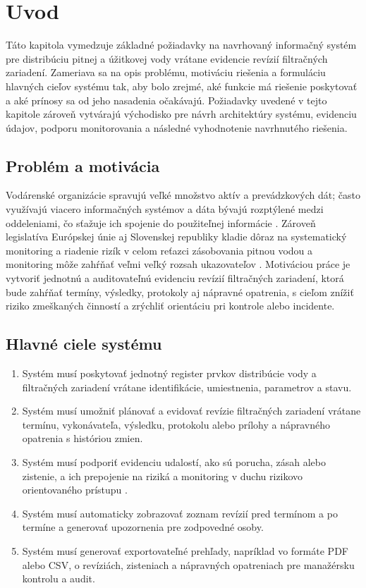 
\chapter{Uvod}

Táto kapitola vymedzuje základné požiadavky na navrhovaný informačný systém pre distribúciu pitnej a úžitkovej vody vrátane evidencie revízií filtračných zariadení. Zameriava sa na opis problému, motiváciu riešenia a formuláciu hlavných cieľov systému tak, aby bolo zrejmé, aké funkcie má riešenie poskytovať a aké prínosy sa od jeho nasadenia očakávajú. Požiadavky uvedené v tejto kapitole zároveň vytvárajú východisko pre návrh architektúry systému, evidenciu údajov, podporu monitorovania a následné vyhodnotenie navrhnutého riešenia.

\section{Problém a motivácia}

Vodárenské organizácie spravujú veľké množstvo aktív a prevádzkových dát; často využívajú viacero informačných systémov a dáta bývajú rozptýlené medzi oddeleniami, čo sťažuje ich spojenie do použiteľnej informácie \cite{CarricoFerreira2021}. Zároveň legislatíva Európskej únie aj Slovenskej republiky kladie dôraz na systematický monitoring a riadenie rizík v celom reťazci zásobovania pitnou vodou \cite{EUDWD2020,SKVyhlaska912023} a monitoring môže zahŕňať veľmi veľký rozsah ukazovateľov \cite{UVZPitnaVodaMapy}. Motiváciou práce je vytvoriť jednotnú a auditovateľnú evidenciu revízií filtračných zariadení, ktorá bude zahŕňať termíny, výsledky, protokoly aj nápravné opatrenia, s cieľom znížiť riziko zmeškaných činností a zrýchliť orientáciu pri kontrole alebo incidente.

\section{Hlavné ciele systému} 

\begin{enumerate}[label=\arabic*.]
\item Systém musí poskytovať jednotný register prvkov distribúcie vody a filtračných zariadení vrátane identifikácie, umiestnenia, parametrov a stavu.
\item Systém musí umožniť plánovať a evidovať revízie filtračných zariadení vrátane termínu, vykonávateľa, výsledku, protokolu alebo prílohy a nápravného opatrenia s históriou zmien.
\item Systém musí podporiť evidenciu udalostí, ako sú porucha, zásah alebo zistenie, a ich prepojenie na riziká a monitoring v duchu rizikovo orientovaného prístupu \cite{EUDWD2020,SKVyhlaska912023}.
\item Systém musí automaticky zobrazovať zoznam revízií pred termínom a po termíne a generovať upozornenia pre zodpovedné osoby.
\item Systém musí generovať exportovateľné prehľady, napríklad vo formáte PDF alebo CSV, o revíziách, zisteniach a nápravných opatreniach pre manažérsku kontrolu a audit.
\end{enumerate}

